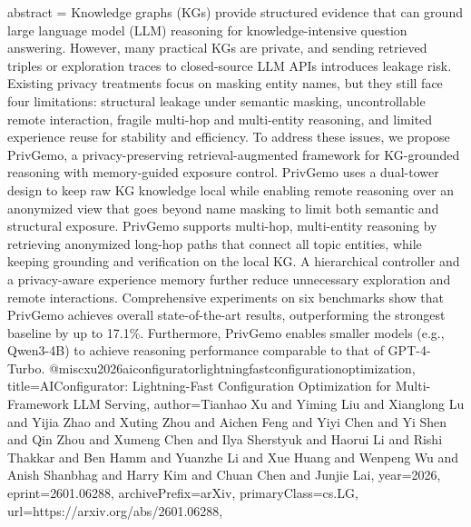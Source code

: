{      abstract = {Knowledge graphs (KGs) provide structured evidence that can ground large language model (LLM) reasoning for knowledge-intensive question answering. However, many practical KGs are private, and sending retrieved triples or exploration traces to closed-source LLM APIs introduces leakage risk. Existing privacy treatments focus on masking entity names, but they still face four limitations: structural leakage under semantic masking, uncontrollable remote interaction, fragile multi-hop and multi-entity reasoning, and limited experience reuse for stability and efficiency. To address these issues, we propose PrivGemo, a privacy-preserving retrieval-augmented framework for KG-grounded reasoning with memory-guided exposure control. PrivGemo uses a dual-tower design to keep raw KG knowledge local while enabling remote reasoning over an anonymized view that goes beyond name masking to limit both semantic and structural exposure. PrivGemo supports multi-hop, multi-entity reasoning by retrieving anonymized long-hop paths that connect all topic entities, while keeping grounding and verification on the local KG. A hierarchical controller and a privacy-aware experience memory further reduce unnecessary exploration and remote interactions. Comprehensive experiments on six benchmarks show that PrivGemo achieves overall state-of-the-art results, outperforming the strongest baseline by up to 17.1\%. Furthermore, PrivGemo enables smaller models (e.g., Qwen3-4B) to achieve reasoning performance comparable to that of GPT-4-Turbo.}
}@misc{xu2026aiconfiguratorlightningfastconfigurationoptimization,
      title={AIConfigurator: Lightning-Fast Configuration Optimization for Multi-Framework LLM Serving}, 
      author={Tianhao Xu and Yiming Liu and Xianglong Lu and Yijia Zhao and Xuting Zhou and Aichen Feng and Yiyi Chen and Yi Shen and Qin Zhou and Xumeng Chen and Ilya Sherstyuk and Haorui Li and Rishi Thakkar and Ben Hamm and Yuanzhe Li and Xue Huang and Wenpeng Wu and Anish Shanbhag and Harry Kim and Chuan Chen and Junjie Lai},
      year={2026},
      eprint={2601.06288},
      archivePrefix={arXiv},
      primaryClass={cs.LG},
      url={https://arxiv.org/abs/2601.06288},
}
